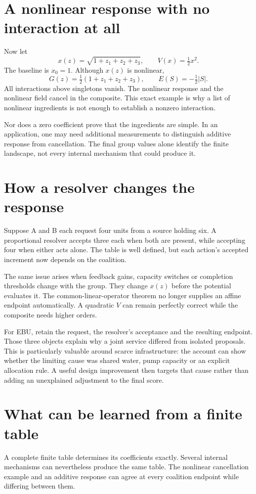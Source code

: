 \section{A nonlinear response with no interaction at all}
Now let
\begin{equation}
 x(z)=\sqrt{1+z_1+z_2+z_3},\qquad V(x)=\tfrac12x^2.
\end{equation}
The baseline is $x_0=1$. Although $x(z)$ is nonlinear,
\begin{equation}
 G(z)=\tfrac12(1+z_1+z_2+z_3),
 \qquad E(S)=-\tfrac12|S|.
\end{equation}
All interactions above singletons vanish. The nonlinear response and the nonlinear field cancel in the composite. This exact example is why a list of nonlinear ingredients is not enough to establish a nonzero interaction.

Nor does a zero coefficient prove that the ingredients are simple. In an application, one may need additional measurements to distinguish additive response from cancellation. The final group values alone identify the finite landscape, not every internal mechanism that could produce it.

\section{How a resolver changes the response}
Suppose A and B each request four units from a source holding six. A proportional resolver accepts three each when both are present, while accepting four when either acts alone. The table is well defined, but each action's accepted increment now depends on the coalition.

The same issue arises when feedback gains, capacity switches or completion thresholds change with the group. They change $x(z)$ before the potential evaluates it. The common-linear-operator theorem no longer supplies an affine endpoint automatically. A quadratic $V$ can remain perfectly correct while the composite needs higher orders.

For EBU, retain the request, the resolver's acceptance and the resulting endpoint. Those three objects explain why a joint service differed from isolated proposals. This is particularly valuable around scarce infrastructure: the account can show whether the limiting cause was shared water, pump capacity or an explicit allocation rule. A useful design improvement then targets that cause rather than adding an unexplained adjustment to the final score.

\section{What can be learned from a finite table}
A complete finite table determines its coefficients exactly. Several internal mechanisms can nevertheless produce the same table. The nonlinear cancellation example and an additive response can agree at every coalition endpoint while differing between them.

